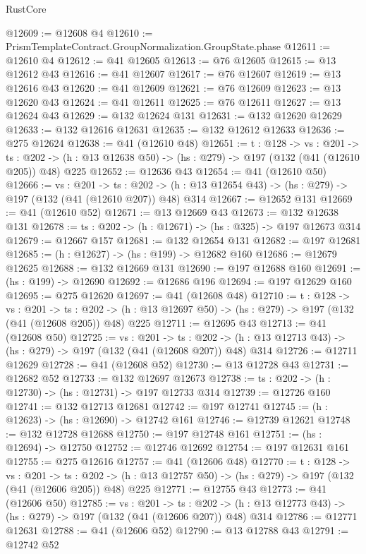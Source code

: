 \begin{lexlean}{RustCore}
\begin{coremodule}
@12609 := @12608 @4
@12610 := PrismTemplateContract.GroupNormalization.GroupState.phase
@12611 := @12610 @4
@12612 := @41 @12605
@12613 := @76 @12605
@12615 := @13 @12612 @43
@12616 := @41 @12607
@12617 := @76 @12607
@12619 := @13 @12616 @43
@12620 := @41 @12609
@12621 := @76 @12609
@12623 := @13 @12620 @43
@12624 := @41 @12611
@12625 := @76 @12611
@12627 := @13 @12624 @43
@12629 := @132 @12624 @131
@12631 := @132 @12620 @12629
@12633 := @132 @12616 @12631
@12635 := @132 @12612 @12633
@12636 := @275 @12624
@12638 := @41 (@12610 @48)
@12651 := {t : @128} ->
  {vs : @201} ->
  {ts : @202} -> (h : @13 @12638 @50) -> (hs : @279) -> @197 (@132 (@41 (@12610 @205)) @48) @225
@12652 := @12636 @43
@12654 := @41 (@12610 @50)
@12666 := {vs : @201} ->
  {ts : @202} -> (h : @13 @12654 @43) -> (hs : @279) -> @197 (@132 (@41 (@12610 @207)) @48) @314
@12667 := @12652 @131
@12669 := @41 (@12610 @52)
@12671 := @13 @12669 @43
@12673 := @132 @12638 @131
@12678 := {ts : @202} -> (h : @12671) -> (hs : @325) -> @197 @12673 @314
@12679 := @12667 @157
@12681 := @132 @12654 @131
@12682 := @197 @12681
@12685 := (h : @12627) -> (hs : @199) -> @12682 @160
@12686 := @12679 @12625
@12688 := @132 @12669 @131
@12690 := @197 @12688 @160
@12691 := (hs : @199) -> @12690
@12692 := @12686 @196
@12694 := @197 @12629 @160
@12695 := @275 @12620
@12697 := @41 (@12608 @48)
@12710 := {t : @128} ->
  {vs : @201} ->
  {ts : @202} -> (h : @13 @12697 @50) -> (hs : @279) -> @197 (@132 (@41 (@12608 @205)) @48) @225
@12711 := @12695 @43
@12713 := @41 (@12608 @50)
@12725 := {vs : @201} ->
  {ts : @202} -> (h : @13 @12713 @43) -> (hs : @279) -> @197 (@132 (@41 (@12608 @207)) @48) @314
@12726 := @12711 @12629
@12728 := @41 (@12608 @52)
@12730 := @13 @12728 @43
@12731 := @12682 @52
@12733 := @132 @12697 @12673
@12738 := {ts : @202} -> (h : @12730) -> (hs : @12731) -> @197 @12733 @314
@12739 := @12726 @160
@12741 := @132 @12713 @12681
@12742 := @197 @12741
@12745 := (h : @12623) -> (hs : @12690) -> @12742 @161
@12746 := @12739 @12621
@12748 := @132 @12728 @12688
@12750 := @197 @12748 @161
@12751 := (hs : @12694) -> @12750
@12752 := @12746 @12692
@12754 := @197 @12631 @161
@12755 := @275 @12616
@12757 := @41 (@12606 @48)
@12770 := {t : @128} ->
  {vs : @201} ->
  {ts : @202} -> (h : @13 @12757 @50) -> (hs : @279) -> @197 (@132 (@41 (@12606 @205)) @48) @225
@12771 := @12755 @43
@12773 := @41 (@12606 @50)
@12785 := {vs : @201} ->
  {ts : @202} -> (h : @13 @12773 @43) -> (hs : @279) -> @197 (@132 (@41 (@12606 @207)) @48) @314
@12786 := @12771 @12631
@12788 := @41 (@12606 @52)
@12790 := @13 @12788 @43
@12791 := @12742 @52

\end{coremodule}
\end{lexlean}
